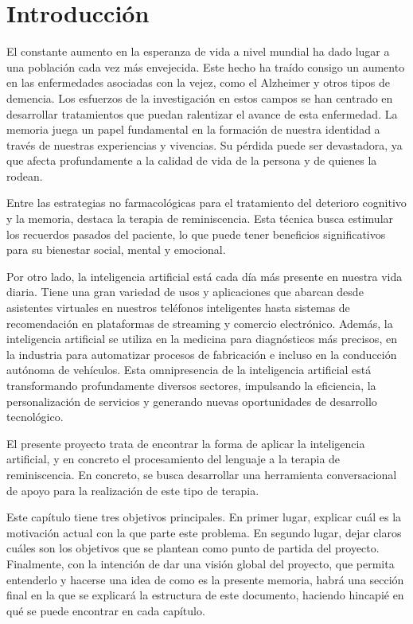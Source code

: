 \chapter{Introducción}
\label{cap:introduccion}


El constante aumento en la esperanza de vida a nivel mundial ha dado lugar a una población cada vez más envejecida. Este hecho ha traído consigo un aumento en las enfermedades asociadas con la vejez, como el Alzheimer y otros tipos de demencia. Los esfuerzos de la investigación en estos campos se han centrado en desarrollar tratamientos que puedan ralentizar el avance de esta enfermedad. La memoria juega un papel fundamental en la formación de nuestra identidad a través de nuestras experiencias y vivencias. Su pérdida puede ser devastadora, ya que afecta profundamente a la calidad de vida de la persona y de quienes la rodean.

Entre las estrategias no farmacológicas para el tratamiento del deterioro cognitivo y la memoria, destaca la terapia de reminiscencia. Esta técnica busca estimular los recuerdos pasados del paciente, lo que puede tener beneficios significativos para su bienestar social, mental y emocional.

Por otro lado, la inteligencia artificial está cada día más presente en nuestra vida diaria. Tiene una gran variedad de usos y aplicaciones que abarcan desde asistentes virtuales en nuestros teléfonos inteligentes hasta sistemas de recomendación en plataformas de streaming y comercio electrónico. Además, la inteligencia artificial se utiliza en la medicina para diagnósticos más precisos, en la industria para automatizar procesos de fabricación e incluso en la conducción autónoma de vehículos. Esta omnipresencia de la inteligencia artificial está transformando profundamente diversos sectores, impulsando la eficiencia, la personalización de servicios y generando nuevas oportunidades de desarrollo tecnológico.  

El presente proyecto trata de encontrar la forma de aplicar la inteligencia artificial, y en concreto el procesamiento del lenguaje a la terapia de reminiscencia. En concreto, se busca desarrollar una herramienta conversacional de apoyo para la realización de este tipo de terapia. 

Este capítulo tiene tres objetivos principales. En primer lugar, explicar cuál es la motivación actual con la que parte este problema. En segundo lugar, dejar claros cuáles son los objetivos que se plantean como punto de partida del proyecto. Finalmente, con la intención de dar una visión global del proyecto, que permita entenderlo y hacerse una idea de como es la presente memoria, habrá una sección final en la que se explicará la estructura de este documento, haciendo hincapié en qué se puede encontrar en cada capítulo.  

